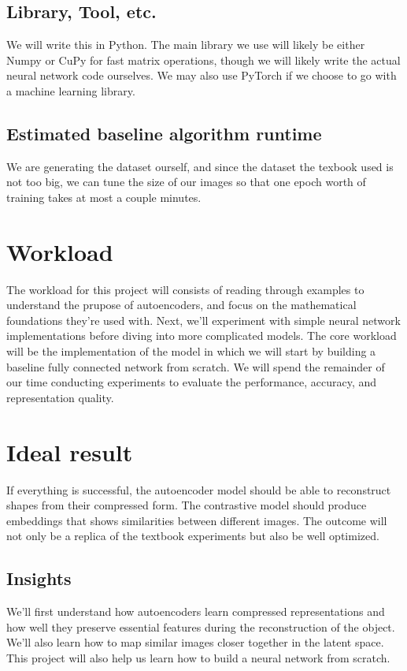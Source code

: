 \documentclass{article}
\begin{document}
\subsection{Library, Tool, etc.}
We will write this in Python.  The main library we use will likely be either Numpy or CuPy for fast matrix operations, though we will likely write the actual neural network code ourselves.  We may also use PyTorch if we choose to go with a machine learning library.

\subsection{Estimated baseline algorithm runtime}

We are generating the dataset ourself, and since the dataset the texbook used is not too big, we can tune the size of our images so that one epoch worth of training takes at most a couple minutes.

\section{Workload}
{\color{black}
The workload for this project will consists of reading through examples to understand the prupose of autoencoders, and focus on the mathematical foundations they're used with. Next, we'll experiment with simple neural network implementations before diving into more complicated models. The core workload will be the implementation of the model in which we will start by building a baseline fully connected network from scratch. We will spend the remainder of our time conducting experiments to evaluate the performance, accuracy, and representation quality.}


\section{Ideal result}
{\color{black}
If everything is successful, the autoencoder model should be able to reconstruct shapes from their compressed form. The contrastive model should produce embeddings that shows similarities between different images. The outcome will not only be a replica of the textbook experiments but also be well optimized.
}

\subsection{Insights}
{\color{black}
We'll first understand how autoencoders learn compressed representations and how well they preserve essential features during the reconstruction of the object. We'll also learn how to map similar images closer together in the latent space. This project will also help us learn how to build a neural network from scratch.
}
\end{document}
